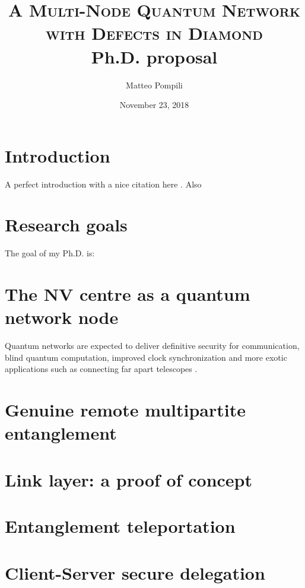 \documentclass[a4paper]{article}
\title{
	\huge{\textsc{A Multi-Node Quantum Network\\with Defects in Diamond}}\\
	\vspace{10pt}\Large{Ph.D. proposal}
}
\author{Matteo Pompili}
\date{November 23, 2018}
\begin{document}
\maketitle

\section*{Introduction}
A perfect introduction with a nice citation here \cite{Humphreys2018}.
Also \blindtext


\tableofcontents

\section{Research goals}
The goal of my Ph.D. is:\\
\par
{}




\section{The NV centre as a quantum network node}

Quantum networks are expected to deliver definitive security for communication, blind quantum computation, improved clock synchronization and more exotic applications such as connecting far apart telescopes \cite{Wehner2018}.

\section{Genuine remote multipartite entanglement}

\section{Link layer: a proof of concept}

\section{Entanglement teleportation}

\section{Client-Server secure delegation}
\end{document}
